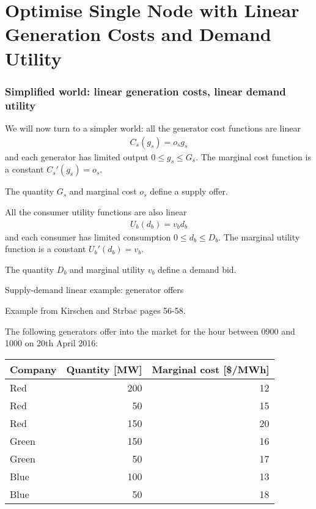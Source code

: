 \documentclass[10pt,aspectratio=169,dvipsnames]{beamer}
\newcommand{\ra}[1]{\renewcommand{\arraystretch}{#1}}
\begin{document}
\section{Optimise Single Node with Linear Generation Costs and Demand Utility}


\begin{frame}[fragile]
  \frametitle{Simplified world: linear generation costs, linear demand utility}

  We will now turn to a simpler world: all the generator cost
  functions are linear
  \begin{align*}
    C_s(g_s) = o_s g_s
  \end{align*}
  and each generator has limited output $0 \leq g_s \leq G_s$. The marginal cost function is a constant $C_s'(g_s) = o_s$.


  The quantity $G_s$ and marginal cost $o_s$ define a \alert{supply offer}.


  All the consumer utility functions are also linear
  \begin{align*}
    U_b(d_b)  = v_b d_b
  \end{align*}
  and each consumer has limited consumption $0 \leq d_b \leq D_b$. The marginal utility function is a constant $U_b'(d_b)  = v_b$.


  The quantity $D_b$ and marginal utility $v_b$ define a \alert{demand bid}.


\end{frame}



\begin{frame}{Supply-demand linear example: generator offers}

  Example from Kirschen and Strbac pages 56-58.

  The following generators offer into the market for the hour between 0900 and 1000 on 20th April 2016:
  \ra{1.1}
  \begin{table}[!t]
    \begin{tabular}{lrr}
      \toprule
      Company & Quantity [MW] &  Marginal cost [\$/MWh]\\
      \midrule
      Red & 200 & 12 \\
      Red & 50 & 15 \\
      Red & 150 & 20 \\
      Green & 150 & 16 \\
      Green & 50 & 17 \\
      Blue & 100 & 13 \\
      Blue & 50 & 18 \\
      \bottomrule
    \end{tabular}
  \end{table}


\end{frame}
\end{document}
